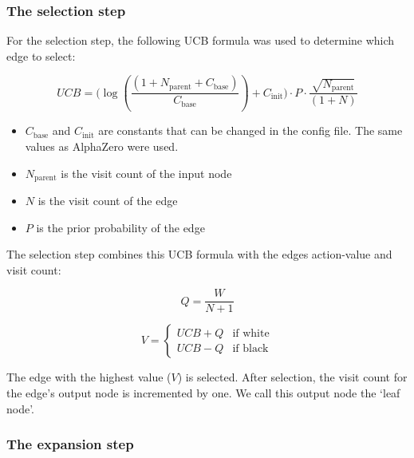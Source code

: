 \documentclass{article}
\begin{document}
\subsubsection{The selection step}

For the selection step, the following UCB formula was used to determine which edge to select:

\begin{center}
    \begin{equation}
        UCB = \Big(\log({\frac{(1 + N_{\text{parent}} + C_{\text{base}})}{C_{\text{base}}}}) + C_{\text{init}}\Big) \cdot P \cdot \frac{\sqrt{N_\text{parent}}}{(1 + N)}
    \end{equation}
\end{center}

\begin{itemize}
    \item $C_{\text{base}}$ and $C_{\text{init}}$ are constants that can be changed in the config file. The same values as AlphaZero were used.
    \item $N_{\text{parent}}$ is the visit count of the input node
    \item $N$ is the visit count of the edge
    \item $P$ is the prior probability of the edge
\end{itemize}

The selection step combines this UCB formula with the edges action-value and visit count:

\begin{center}
    \begin{equation}
        Q = \frac{W}{N+1}
    \end{equation}
\end{center}

\begin{center}
    \begin{equation}
        V = 
        \begin{cases}
            UCB + Q & \text{if white} \\
            UCB - Q & \text{if black}
        \end{cases}
    \end{equation}
\end{center}

The edge with the highest value ($V$) is selected. After selection, the 
visit count for the edge's output node is incremented by one. 
We call this output node the `leaf node'. 

\subsubsection{The expansion step}
\end{document}
